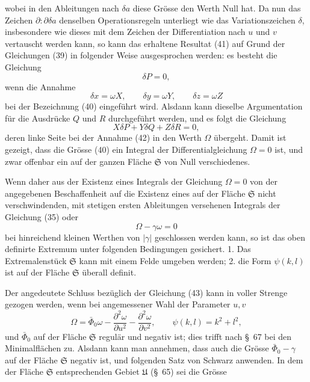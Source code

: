 \documentclass[11pt,a4paper,leqno]{article}
\begin{document}
wobei in den Ableitungen nach $\delta a$ diese Grösse den Werth Null hat. Da
nun das Zeichen $\partial:\partial\delta a$ denselben Operationsregeln
unterliegt wie das Variationszeichen $\delta$, insbesondere wie dieses mit
dem Zeichen der Differentiation nach $u$ und $v$ vertauscht werden kann, so
kann das erhaltene Resultat (41) auf Grund der Gleichungen (39) in folgender
Weise ausgesprochen werden: es besteht die Gleichung
\[
\delta P=0,
\]
wenn die Annahme
\begin{equation}\tag{42}
\delta x=\omega X,\qquad \delta y=\omega Y,\qquad \delta z=\omega Z
\end{equation}
bei der Bezeichnung (40) eingeführt wird. Alsdann kann dieselbe Argumentation
für die Ausdrücke $Q$ und $R$ durchgeführt werden, und es folgt die Gleichung
\[
X\delta P+Y\delta Q+Z\delta R=0,
\]
deren linke Seite bei der Annahme (42) in den Werth $\Omega$ übergeht. Damit
ist gezeigt, dass die Grösse (40) ein Integral der Differentialgleichung
$\Omega=0$ ist, und zwar offenbar ein auf der ganzen Fläche $\mathfrak{S}$
von Null verschiedenes.

Wenn daher aus der Existenz eines Integrals der Gleichung $\Omega=0$ von der
angegebenen Beschaffenheit auf die Existenz eines auf der Fläche
$\mathfrak{S}$ nicht verschwindenden, mit stetigen ersten Ableitungen
versehenen Integrals der Gleichung (35) oder
\begin{equation}\tag{43}
\Omega-\gamma\omega=0
\end{equation}
bei hinreichend kleinen Werthen von $|\gamma|$ geschlossen werden kann, so
ist das oben definirte Extremum unter folgenden Bedingungen gesichert.
1. Das Extremalenstück $\mathfrak{S}$ kann mit einem Felde umgeben werden;
2. die Form $\psi(k,l)$ ist auf der Fläche $\mathfrak{S}$ überall definit.

Der angedeutete Schluss bezüglich der Gleichung (43) kann in voller Strenge
gezogen werden, wenn bei angemessener Wahl der Parameter $u,v$
\[
\Omega=\bar\Phi_0\omega-\frac{\partial^2\omega}{\partial u^2}
-\frac{\partial^2\omega}{\partial v^2},\qquad
\psi(k,l)=k^2+l^2,
\]
und $\bar\Phi_0$ auf der Fläche $\mathfrak{S}$ regulär und negativ ist; dies
trifft nach \S~67 bei den Minimalflächen zu. Alsdann kann man annehmen, dass
auch die Grösse $\bar\Phi_0-\gamma$ auf der Fläche $\mathfrak{S}$ negativ
ist, und folgenden Satz von Schwarz anwenden. In dem der Fläche
$\mathfrak{S}$ entsprechenden Gebiet $\mathfrak{U}$ (\S~65) sei die Grösse
\end{document}
